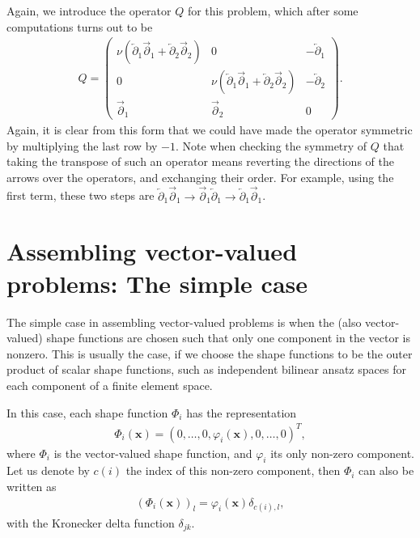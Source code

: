 \documentclass{article}
\newcommand{\leftpartial}{\overleftarrow \partial}
\newcommand{\rightpartial}{\overrightarrow \partial}
\renewcommand{\vec}[1]{{\mathbf #1}}
\begin{document}
Again, we introduce the operator $Q$ for this problem, which after some
computations turns out to be
\begin{gather*}
  Q
  =
  \begin{pmatrix}
    \nu(\leftpartial_1 \rightpartial_1 +
    \leftpartial_2 \rightpartial_2)     & 0 & -\leftpartial_1 \\
    0 & \nu(\leftpartial_1 \rightpartial_1 +
        \leftpartial_2 \rightpartial_2) & -\leftpartial_2 \\
    \rightpartial_1 & \rightpartial_2 & 0
  \end{pmatrix}.
\end{gather*}
Again, it is clear from this form that we could have made the operator
symmetric by multiplying the last row by $-1$. Note when checking the symmetry
of $Q$ that taking the transpose of such an operator means reverting the
directions of the arrows over the operators, and exchanging their order.
For example, using the first term, these two steps are 
$\leftpartial_1 \rightpartial_1 \rightarrow \rightpartial_1 \leftpartial_1
\rightarrow \leftpartial_1 \rightpartial_1$.


\section{Assembling vector-valued problems: The simple case}

The simple case in assembling vector-valued problems is when the (also
vector-valued) shape functions are chosen such that only one component in the
vector is nonzero. This is usually the case, if we choose the shape functions
to be the outer product of scalar shape functions, such as independent
bilinear ansatz spaces for each component of a finite element space.

In this case, each shape function $\Phi_i$ has the representation
\begin{gather*}
  \Phi_i(\vec x) = 
  \left( 0, \dots, 0, \varphi_i(\vec x), 0, \ldots, 0\right)^T,
\end{gather*}
where $\Phi_i$ is the vector-valued shape function, and $\varphi_i$ its
only non-zero component. Let us denote by $c(i)$ the index of this non-zero
component, then $\Phi_i$ can also be written as 
\begin{gather*}
  \left(\Phi_i(\vec x)\right)_l
  =
  \varphi_i(\vec x) \delta_{c(i),l},
\end{gather*}
with the Kronecker delta function $\delta_{jk}$.
\end{document}
